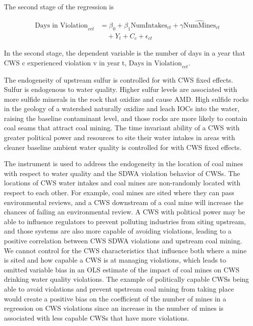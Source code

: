\documentclass{article}
\begin{document}
The second stage of the regression is

\begin{equation}\label{2ndstage2sls}
\begin{split}
\text{Days in Violation}_{vct} &= \beta_0 + \beta_1\text{NumIntakes}_{ct} + \gamma\widehat{\text{NumMines}}_{ct} \\
&\quad + Y_t + C_c + \epsilon_{ct}
\end{split}
\end{equation}

In the second stage, the dependent variable is the number of days in a year that CWS c experienced violation v in year t, $\text{Days in Violation}_{vct}$. 

The endogeneity of upstream sulfur is controlled for with CWS fixed effects. Sulfur is endogenous to water quality. Higher sulfur levels are associated with more sulfide minerals in the rock that oxidize and cause AMD. High sulfide rocks in the geology of a watershed naturally oxidize and leach IOCs into the water, raising the baseline contaminant level, and those rocks are more likely to contain coal seams that attract coal mining. The time invariant ability of a CWS with greater political power and resources to site their water intakes in areas with cleaner baseline ambient water quality is controlled for with CWS fixed effects.

The instrument is used to address the endogeneity in the location of coal mines with respect to water quality and the SDWA violation behavior of CWSs. The locations of CWS water intakes and coal mines are non-randomly located with respect to each other. For example, coal mines are sited where they can pass environmental reviews, and a CWS downstream of a coal mine will increase the chances of failing an environmental review. A CWS with political power may be able to influence regulators to prevent polluting industries from siting upstream, and those systems are also more capable of avoiding violations, leading to a positive correlation between CWS SDWA violations and upstream coal mining. We cannot control for the CWS characteristics that influence both where a mine is sited and how capable a CWS is at managing violations, which leads to omitted variable bias in an OLS estimate of the impact of coal mines on CWS drinking water quality violations. The example of politically capable CWSs being able to avoid violations and prevent upstream coal mining from taking place would create a positive bias on the coefficient of the number of mines in a regression on CWS violations since an increase in the number of mines is associated with less capable CWSs that have more violations.
\end{document}
